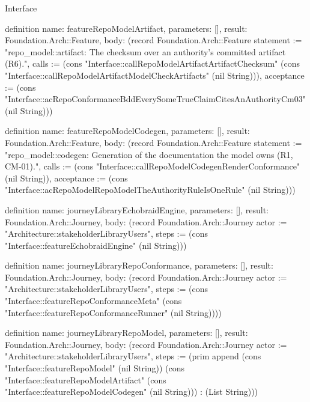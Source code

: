 \begin{lexlean}{Interface}
\begin{semanticmodule}
definition{
  name: featureRepoModelArtifact,
  parameters: [],
  result: Foundation.Arch::Feature,
  body: (record Foundation.Arch::Feature {statement := "repo_model::artifact: The checksum over an authority's committed artifact (R6).", calls := (cons "Interface::callRepoModelArtifactArtifactChecksum" (cons "Interface::callRepoModelArtifactModelCheckArtifacts" (nil String))), acceptance := (cons "Interface::acRepoConformanceBddEverySomeTrueClaimCitesAnAuthorityCm03" (nil String))})
}

definition{
  name: featureRepoModelCodegen,
  parameters: [],
  result: Foundation.Arch::Feature,
  body: (record Foundation.Arch::Feature {statement := "repo_model::codegen: Generation of the documentation the model owns (R1, CM-01).", calls := (cons "Interface::callRepoModelCodegenRenderConformance" (nil String)), acceptance := (cons "Interface::acRepoModelRepoModelTheAuthorityRuleIsOneRule" (nil String))})
}

definition{
  name: journeyLibraryEchobraidEngine,
  parameters: [],
  result: Foundation.Arch::Journey,
  body: (record Foundation.Arch::Journey {actor := "Architecture::stakeholderLibraryUsers", steps := (cons "Interface::featureEchobraidEngine" (nil String))})
}

definition{
  name: journeyLibraryRepoConformance,
  parameters: [],
  result: Foundation.Arch::Journey,
  body: (record Foundation.Arch::Journey {actor := "Architecture::stakeholderLibraryUsers", steps := (cons "Interface::featureRepoConformanceMeta" (cons "Interface::featureRepoConformanceRunner" (nil String)))})
}

definition{
  name: journeyLibraryRepoModel,
  parameters: [],
  result: Foundation.Arch::Journey,
  body: (record Foundation.Arch::Journey {actor := "Architecture::stakeholderLibraryUsers", steps := (prim append (cons "Interface::featureRepoModel" (nil String)) (cons "Interface::featureRepoModelArtifact" (cons "Interface::featureRepoModelCodegen" (nil String))) : (List String))})
}
\end{semanticmodule}
\end{lexlean}
